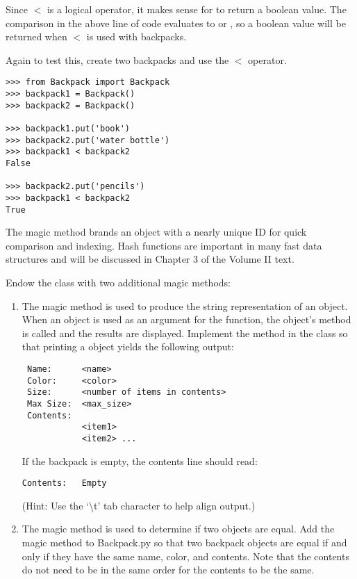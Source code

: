 Since $<$ is a logical operator, it makes sense for  to return a boolean value.
The comparison in the above line of code evaluates to  or , so a boolean value will be returned when $<$ is used with backpacks.

Again to test this, create two backpacks and use the $<$ operator.
\begin{lstlisting}
>>> from Backpack import Backpack
>>> backpack1 = Backpack()
>>> backpack2 = Backpack()

>>> backpack1.put('book')
>>> backpack2.put('water bottle')
>>> backpack1 < backpack2
False

>>> backpack2.put('pencils')
>>> backpack1 < backpack2
True
\end{lstlisting}

\begin{info}
The  magic method brands an object with a nearly unique ID for quick comparison and indexing.
Hash functions are important in many fast data structures and will be discussed in Chapter 3 of the Volume II text.
\end{info}

\begin{problem}
Endow the  class with two additional magic methods:
\begin{enumerate}
\item The  magic method is used to produce the string representation of an object.
When an object is used as an argument for the  function, the object's  method is called and the results are displayed.
Implement the  method in the  class so that printing a  object yields the following output:
\begin{lstlisting}
 Name:		<name>
 Color:		<color>
 Size:		<number of items in contents>
 Max Size:	<max_size>
 Contents:
 			<item1>
 			<item2> ...
\end{lstlisting}
If the backpack is empty, the contents line should read:
\begin{lstlisting}
Contents:	Empty
\end{lstlisting}
(Hint: Use the `\textbackslash{t}' tab character to help align output.)

\item The  magic method is used to determine if two objects are equal. Add the  magic method to Backpack.py so that two backpack objects are equal if and only if they have the same name, color, and contents. Note that the contents do not need to be in the same order for the contents to be the same.
\end{enumerate}
\end{problem}

